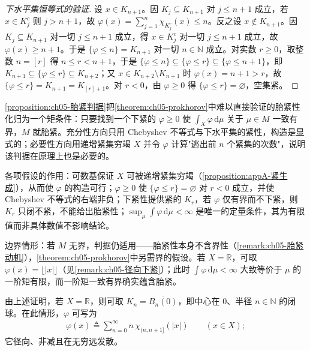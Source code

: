 \documentclass[../../main.tex]{subfiles}%
\begin{document}
\begin{proof}[下水平集恒等式的验证]
设 $x\in K_{n+1}$。因 $K_j\subseteq K_{n+1}$ 对 $j\leqslant n+1$ 成立，若 $x\in K_j^c$ 则 $j>n+1$，故 $\varphi(x)=\sum_{j=1}^{n}\chi_{K_j^c}(x)\leqslant n$。反之设 $x\notin K_{n+1}$。因 $K_j\subseteq K_{n+1}$ 对一切 $j\leqslant n+1$ 成立，得 $x\in K_j^c$ 对一切 $j\leqslant n+1$ 成立，故 $\varphi(x)\geqslant n+1$。于是 $\{\varphi\leqslant n\}=K_{n+1}$ 对一切 $n\in\mathbb{N}$ 成立。对实数 $r\geqslant0$，取整数 $n=[r]$ 得 $n\leqslant r<n+1$，于是 $\{\varphi\leqslant n\}\subseteq\{\varphi\leqslant r\}\subseteq\{\varphi\leqslant n+1\}$，即 $K_{n+1}\subseteq\{\varphi\leqslant r\}\subseteq K_{n+2}$；又 $x\in K_{n+2}\setminus K_{n+1}$ 时 $\varphi(x)=n+1>r$，故 $\{\varphi\leqslant r\}=K_{n+1}=K_{[r]+1}$。对 $r<0$，由 $\varphi\geqslant0$ 得 $\{\varphi\leqslant r\}=\varnothing$，空集紧。
\end{proof}

\begin{remark}\label{remark:ch05-胎紧判据动机}
\cref{proposition:ch05-胎紧判据}把\cref{theorem:ch05-prokhorov}中难以直接验证的胎紧性化归为一个矩条件：只要找到一个下紧的 $\varphi\geqslant0$ 使 $\int_X\varphi\,\mathrm{d}\mu$ 关于 $\mu\in M$ 一致有界，$M$ 就胎紧。充分性方向只用 Chebyshev 不等式与下水平集的紧性，构造是显式的；必要性方向用递增紧集穷竭 $X$ 并令 $\varphi$ 计算"逃出前 $n$ 个紧集的次数"，说明该判据在原理上也是必要的。

各项假设的作用：可数基保证 $X$ 可被递增紧集穷竭（\cref{proposition:appA-紧生成}），从而使 $\varphi$ 的构造可行；$\varphi\geqslant0$ 使 $\{\varphi\leqslant r\}=\varnothing$ 对 $r<0$ 成立，并使 Chebyshev 不等式的右端非负；下紧性提供紧的 $K_r$，若 $\varphi$ 仅有界而不下紧，则 $K_r$ 只闭不紧，不能给出胎紧性；$\sup_\mu\int\varphi\,\mathrm{d}\mu<\infty$ 是唯一的定量条件，其为有限值而非具体数值不影响结论。

边界情形：若 $M$ 无界，判据仍适用——胎紧性本身不含界性（\cref{remark:ch05-胎紧动机}），\cref{theorem:ch05-prokhorov}中另需界的假设。若 $X=\mathbb{R}$，可取 $\varphi(x)=\lfloor|x|\rfloor$（见\cref{remark:ch05-径向下紧}）；此时 $\int\varphi\,\mathrm{d}\mu<\infty$ 大致等价于 $\mu$ 的一阶矩有限，而一阶矩一致有界确实蕴含胎紧。
\end{remark}

\begin{remark}\label{remark:ch05-径向下紧}
由上述证明，若 $X=\mathbb{R}$，则可取 $K_n=\overline{B_n(0)}$，即中心在 $0$、半径 $n\in\mathbb{N}$ 的闭球。在此情形，$\varphi$ 可写为
\begin{align*}
\varphi(x)\triangleq \sum_{n=0}^\infty n\,\chi_{(n,n+1]}(|x|)\qquad(x\in X);
\end{align*}
它径向、非减且在无穷远发散。
\end{remark}
\end{document}
